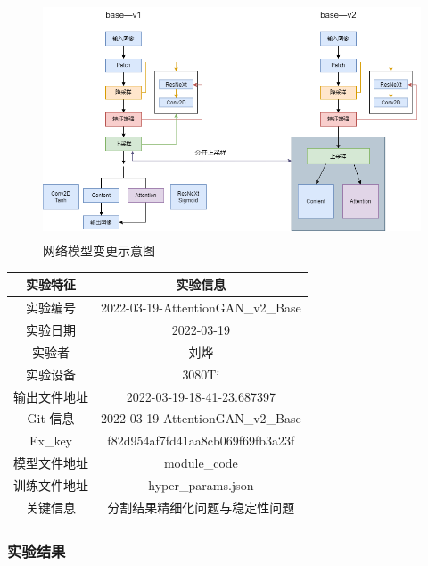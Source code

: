 \begin{figure}[H]
	\centering
	\includegraphics[width=338pt,height=200pt]{0319//03-14-AttentionGAN_base}
	\caption{网络模型变更示意图}
\end{figure}


\begin{table}[H]
	\centering
	\begin{spacing}{1.5}
		\begin{tabular}{cc}\hline
			实验特征 & 实验信息 \\
			\hline
			实验编号 & 2022-03-19-AttentionGAN\_v2\_Base\\
			实验日期 & 2022-03-19 \\
			实验者 & 刘烨\\
			实验设备& 3080Ti\\
			输出文件地址 & 2022-03-19-18-41-23.687397\\
			Git 信息 & 2022-03-19-AttentionGAN\_v2\_Base\\
			Ex\_key & f82d954af7fd41aa8cb069f69fb3a23f\\
			模型文件地址 & module\_code\\
			训练文件地址 & hyper\_params.json\\
			关键信息 & \colorbox{red!40}{分割结果精细化问题与稳定性问题}\\\hline
		\end{tabular}
	\end{spacing}
\end{table}


\subsubsection{实验结果}

